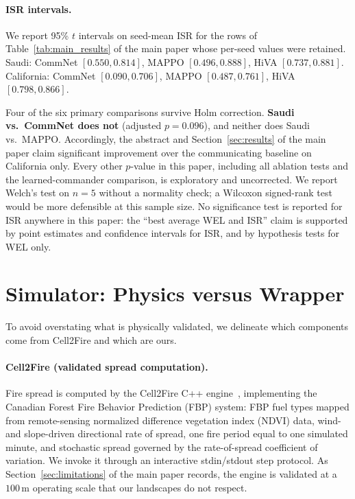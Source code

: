 \documentclass[letterpaper]{article}
\begin{document}
\paragraph{ISR intervals.} We report 95\% $t$ intervals on seed-mean ISR for the rows of Table~\ref{tab:main_results} of the main paper whose per-seed values were retained. Saudi: CommNet $[0.550, 0.814]$, MAPPO $[0.496, 0.888]$, HiVA $[0.737, 0.881]$. California: CommNet $[0.090, 0.706]$, MAPPO $[0.487, 0.761]$, HiVA $[0.798, 0.866]$.

Four of the six primary comparisons survive Holm correction. \textbf{Saudi vs.\ CommNet does not} (adjusted $p = 0.096$), and neither does Saudi vs.\ MAPPO. Accordingly, the abstract and Section~\ref{sec:results} of the main paper claim significant improvement over the communicating baseline on California only. Every other $p$-value in this paper, including all ablation tests and the learned-commander comparison, is exploratory and uncorrected. We report Welch's test on $n = 5$ without a normality check; a Wilcoxon signed-rank test would be more defensible at this sample size. No significance test is reported for ISR anywhere in this paper: the ``best average WEL and ISR'' claim is supported by point estimates and confidence intervals for ISR, and by hypothesis tests for WEL only.

\section{Simulator: Physics versus Wrapper}
\label{app:simulator}

To avoid overstating what is physically validated, we delineate which components come from Cell2Fire and which are ours.

\paragraph{Cell2Fire (validated spread computation).} Fire spread is computed by the Cell2Fire C++ engine~\citep{pais2021cell2fire}, implementing the Canadian Forest Fire Behavior Prediction (FBP) system: FBP fuel types mapped from remote-sensing normalized difference vegetation index (NDVI) data, wind- and slope-driven directional rate of spread, one fire period equal to one simulated minute, and stochastic spread governed by the rate-of-spread coefficient of variation. We invoke it through an interactive stdin/stdout step protocol. As Section~\ref{sec:limitations} of the main paper records, the engine is validated at a $100$\,m operating scale that our landscapes do not respect.
\end{document}
